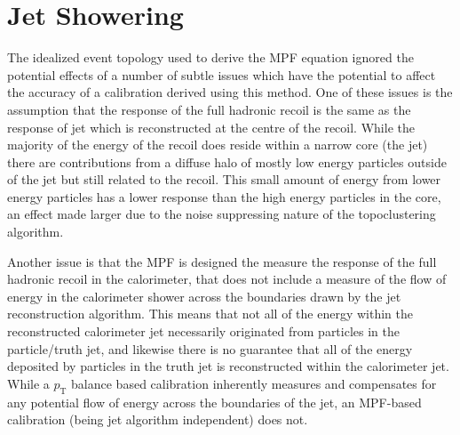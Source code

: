 \section{Jet Showering}
\label{sec:ShoweringIntro}
The idealized event topology used to derive the MPF equation ignored the potential effects of a number of subtle issues which have the potential to affect the accuracy of a calibration derived using this method.
One of these issues is the assumption that the response of the full hadronic recoil is the same as the response of jet which is reconstructed at the centre of the recoil.
While the majority of the energy of the recoil does reside within a narrow core (the jet) there are contributions from a diffuse halo of mostly low energy particles outside of the jet but still related to the recoil.  
This small amount of energy from lower energy particles has a lower response than the high energy particles in the core, an effect made larger due to the noise suppressing nature of the topoclustering algorithm.

Another issue is that the MPF is designed the measure the response of the full hadronic recoil in the calorimeter, that does not include a measure of the flow of energy in the calorimeter shower across the boundaries drawn by the jet reconstruction algorithm.
This means that not all of the energy within the reconstructed calorimeter jet necessarily originated from particles in the particle/truth jet, and likewise there is no guarantee that all of the energy deposited by particles in the truth jet is reconstructed within the calorimeter jet.
While a $p_{\mathrm T}$ balance based calibration inherently measures and compensates for any potential flow of energy across the boundaries of the jet, an MPF-based calibration (being jet algorithm independent) does not.

